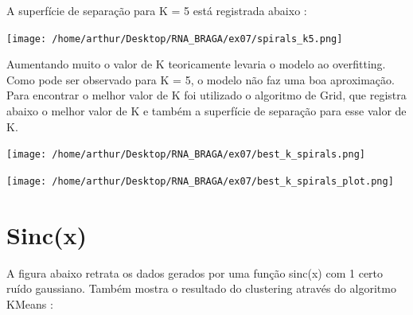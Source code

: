 \documentclass{article}
\begin{document}
\vspace{10pt}

A superfície de separação para K = 5 está registrada abaixo : 

\vspace{10pt}

\begin{center}

\texttt{[image: /home/arthur/Desktop/RNA\_BRAGA/ex07/spirals\_k5.png]}
            
\end{center}

\vspace{10pt}

Aumentando muito o valor de K teoricamente levaria o modelo ao overfitting. Como pode ser observado para K = 5, o modelo não faz uma boa aproximação. Para encontrar o melhor valor de K foi utilizado o algoritmo de Grid, que registra abaixo o melhor valor de K e também a superfície de separação para esse valor de K.

\vspace{10pt}

\begin{center}

\texttt{[image: /home/arthur/Desktop/RNA\_BRAGA/ex07/best\_k\_spirals.png]}
                
\end{center}

\vspace{10pt}

\begin{center}

\texttt{[image: /home/arthur/Desktop/RNA\_BRAGA/ex07/best\_k\_spirals\_plot.png]}
                
\end{center}


\vspace{20pt}


\section{Sinc(x)}

\vspace{10pt}

A figura abaixo retrata os dados gerados por uma função sinc(x) com 1 certo ruído gaussiano. Também mostra o resultado do clustering através do algoritmo KMeans :

\vspace{10pt}
\end{document}
